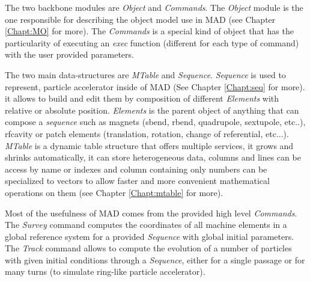 The two backbone modules are \emph{Object} and \emph{Commands}. The \emph{Object}
module is the one responsible for describing the object model use in MAD (see
Chapter \ref{Chapt:MO} for more). The \emph{Commands} is a special kind of
object that has the particularity of executing an \emph{exec} function
(different for each type of command) with the user provided parameters.

The two main data-structures are \emph{MTable} and \emph{Sequence}.
\emph{Sequence} is used to represent, particle accelerator inside of MAD (See
Chapter \ref{Chapt:seq} for more). it allows to build and edit them by
composition of different \emph{Elements} with relative or absolute position.
\emph{Elements} is the parent object of anything that can compose a
\emph{sequence} such as magnets (sbend, rbend, quadrupole, sextupole, etc..),
rfcavity or patch elements (translation, rotation, change of referential,
etc...). \emph{MTable} is a dynamic table structure that offers multiple
services, it grows and shrinks automatically, it can store heterogeneous data,
columns and lines can be access by name or indexes and column containing only
numbers can be specialized to vectors to allow faster and more convenient
mathematical operations on them (see Chapter \ref{Chapt:mtable} for more).

Most of the usefulness of MAD comes from the provided high level \emph{Commands}.
The \emph{Survey} command computes the coordinates of all machine elements in a
global reference system for a provided \emph{Sequence} with global initial
parameters. The \emph{Track} command allows to compute the evolution of a number
of particles with given initial conditions through a \emph{Sequence}, either for
a single passage or for many turns (to simulate ring-like particle accelerator).